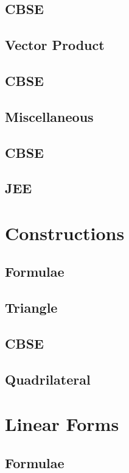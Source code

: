 \documentclass[journal]{IEEEtran}
\begin{document}
	\subsection{CBSE}
	
	\subsection{Vector Product}
	
	\subsection{CBSE}
	
	\subsection{Miscellaneous}
	
	\subsection{CBSE}
	
	\subsection{JEE}
	
	\newpage
	\section{Constructions}
	\subsection{Formulae}
	
	\subsection{Triangle}
	
	\subsection{CBSE}
	
	\subsection{Quadrilateral}
	
	\newpage
	\section{Linear Forms}
	\subsection{Formulae}
	
\end{document}
